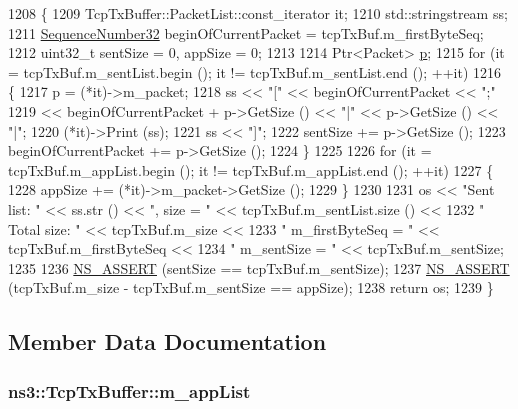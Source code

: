 \begin{DoxyCode}
1208 \{
1209   TcpTxBuffer::PacketList::const\_iterator it;
1210   std::stringstream ss;
1211   \hyperlink{group__network_gacb2070e4e98d2d5135c9bede58f07a03}{SequenceNumber32} beginOfCurrentPacket = tcpTxBuf.m\_firstByteSeq;
1212   uint32\_t sentSize = 0, appSize = 0;
1213 
1214   Ptr<Packet> \hyperlink{lte__link__budget_8m_ac9de518908a968428863f829398a4e62}{p};
1215   \textcolor{keywordflow}{for} (it = tcpTxBuf.m\_sentList.begin (); it != tcpTxBuf.m\_sentList.end (); ++it)
1216     \{
1217       p = (*it)->m\_packet;
1218       ss << \textcolor{stringliteral}{"["} << beginOfCurrentPacket << \textcolor{stringliteral}{";"}
1219          << beginOfCurrentPacket + p->GetSize () << \textcolor{stringliteral}{"|"} << p->GetSize () << \textcolor{stringliteral}{"|"};
1220       (*it)->Print (ss);
1221       ss << \textcolor{stringliteral}{"]"};
1222       sentSize += p->GetSize ();
1223       beginOfCurrentPacket += p->GetSize ();
1224     \}
1225 
1226   \textcolor{keywordflow}{for} (it = tcpTxBuf.m\_appList.begin (); it != tcpTxBuf.m\_appList.end (); ++it)
1227     \{
1228       appSize += (*it)->m\_packet->GetSize ();
1229     \}
1230 
1231   os << \textcolor{stringliteral}{"Sent list: "} << ss.str () << \textcolor{stringliteral}{", size = "} << tcpTxBuf.m\_sentList.size () <<
1232     \textcolor{stringliteral}{" Total size: "} << tcpTxBuf.m\_size <<
1233     \textcolor{stringliteral}{" m\_firstByteSeq = "} << tcpTxBuf.m\_firstByteSeq <<
1234     \textcolor{stringliteral}{" m\_sentSize = "} << tcpTxBuf.m\_sentSize;
1235 
1236   \hyperlink{assert_8h_a6dccdb0de9b252f60088ce281c49d052}{NS\_ASSERT} (sentSize == tcpTxBuf.m\_sentSize);
1237   \hyperlink{assert_8h_a6dccdb0de9b252f60088ce281c49d052}{NS\_ASSERT} (tcpTxBuf.m\_size - tcpTxBuf.m\_sentSize == appSize);
1238   \textcolor{keywordflow}{return} os;
1239 \}
\end{DoxyCode}


\subsection{Member Data Documentation}
\subsubsection[{\texorpdfstring{m\+\_\+app\+List}{m_appList}}]{ ns3\+::\+Tcp\+Tx\+Buffer\+::m\+\_\+app\+List\hspace{0.3cm}{\ttfamily [private]}}\hypertarget{classns3_1_1TcpTxBuffer_ac85673c102b50188282a70152cc542ca}{}\label{classns3_1_1TcpTxBuffer_ac85673c102b50188282a70152cc542ca}


